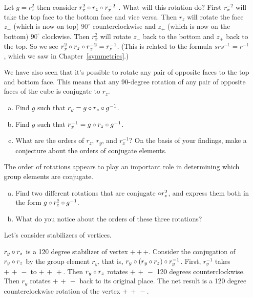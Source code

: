 \begin{example}\label{example:actions:Conj9} 
Let  $g=r_x^2$ then consider $r_x^2\circ r_z\circ r_x^{-2}$ .   What will this rotation do? First $r_x^{-2}$ will take the top face to the bottom face and vice versa. Then $r_z$ will rotate the face $z_-$ (which is now on top)   $90^{\circ}$ counterclockwise and  $z_+$ (which is now on the bottom)  $90^{\circ}$ clockwise.  Then $r_x^2$ will rotate $z_-$ back to the bottom and $z_+$ back to the top.  So we see $r_x^2\circ r_z\circ r_x^{-2} = r_z^{-1}$. (This is related to the formula $s r s^{-1} = r^{-1}$, which we saw in Chapter~\ref{symmetries}.)  
\end{example}

We have also seen that it's possible to rotate any pair of opposite faces to the top and bottom face. This means that any 90-degree rotation of any pair of opposite faces of the cube is conjugate to $r_z$.  

\begin{exercise}\label{exercise:actions:Conj10}
\begin{enumerate} [(a)]
\item 
Find $g$ such that $r_y = g \circ r_z \circ g^{-1}$.
\item 
Find $g$ such that $r_x^{-1} = g \circ r_z \circ g^{-1}$.
\item What  are the orders of $r_z$, $r_y$, and $r_x^{-1}$? On the basis of your findings, make a conjecture about the orders of conjugate elements.
\end{enumerate}
\end{exercise}

The order of rotations appears to play an important role in determining which group elements are conjugate.

\begin{exercise}\label{exercise:actions:Conj11}
\begin{enumerate}[(a)]
\item Find two different rotations that are conjugate $\circ r_z^2$, and express them both in the form 
$ g \circ r_z^2 \circ g^{-1}$.
\item What do you notice about the orders of these three rotations?
\end{enumerate}
\end{exercise}

 Let's consider stabilizers of vertices.

\begin{example}\label{example:actions:Conj12}
 $r_y\circ r_z$ is a 120 degree stabilizer of vertex {+\,+\,+}.  Consider the conjugation of $r_y\circ r_z$ by the group element $r_y$, that is,  $r_y\circ (r_y\circ r_z)\circ r_y^{-1}$. First, $r_y^{-1}$ takes ${+\,+\,-}$ to ${+\,+\,+}$.  Then $r_y\circ r_z$ rotates ${+\,+\,-}$ 120 degrees counterclockwise. Then $r_y$ rotates ${+\,+\,-}$ back to its original place.  The net result is a 120 degree counterclockwise rotation of the vertex ${+\,+\,-}$.
\end{example}

